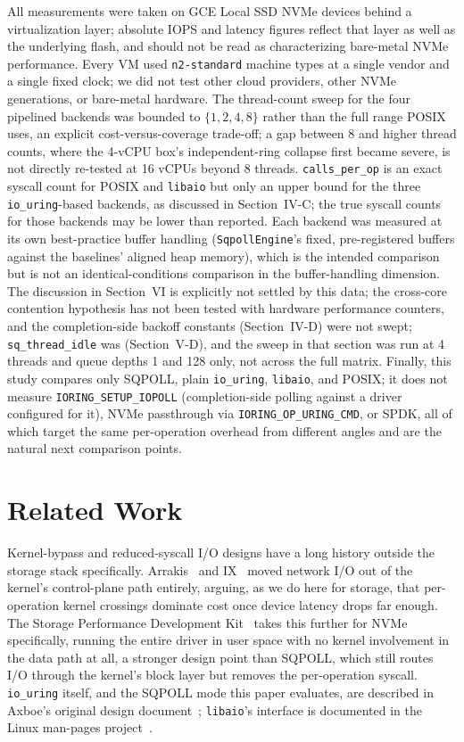 \documentclass[conference]{IEEEtran}
\begin{document}
All measurements were taken on GCE Local SSD NVMe devices behind a virtualization layer;
absolute IOPS and latency figures reflect that layer as well as the underlying flash, and should
not be read as characterizing bare-metal NVMe performance. Every VM used \texttt{n2-standard}
machine types at a single vendor and a single fixed clock; we did not test other cloud providers,
other NVMe generations, or bare-metal hardware. The thread-count sweep for the four pipelined
backends was bounded to $\{1, 2, 4, 8\}$ rather than the full range POSIX uses, an explicit
cost-versus-coverage trade-off; a gap between 8 and higher thread counts, where the 4-vCPU box's
independent-ring collapse first became severe, is not directly re-tested at 16 vCPUs beyond 8
threads. \texttt{calls\_per\_op} is an exact syscall count for POSIX and \texttt{libaio} but only
an upper bound for the three \texttt{io\_uring}-based backends, as discussed in Section~IV-C; the
true syscall counts for those backends may be lower than reported. Each backend was measured at
its own best-practice buffer handling (\texttt{SqpollEngine}'s fixed, pre-registered buffers
against the baselines' aligned heap memory), which is the intended comparison but is not an
identical-conditions comparison in the buffer-handling dimension. The discussion in Section~VI is
explicitly not settled by this data; the cross-core contention hypothesis has not been tested
with hardware performance counters, and the completion-side backoff constants
(Section~IV-D) were not swept; \texttt{sq\_thread\_idle} was (Section~V-D), and the sweep in
that section was run at 4 threads and queue depths 1 and 128 only, not across the full matrix. Finally, this study compares only SQPOLL, plain
\texttt{io\_uring}, \texttt{libaio}, and POSIX; it does not measure
\texttt{IORING\_SETUP\_IOPOLL} (completion-side polling against a driver configured for it),
NVMe passthrough via \texttt{IORING\_OP\_URING\_CMD}, or SPDK, all of which target the same
per-operation overhead from different angles and are the natural next comparison points.

\section{Related Work}

Kernel-bypass and reduced-syscall I/O designs have a long history outside the storage stack
specifically. Arrakis~\cite{arrakis} and IX~\cite{ix} moved network I/O out of the kernel's
control-plane path entirely, arguing, as we do here for storage, that per-operation kernel
crossings dominate cost once device latency drops far enough. The Storage Performance
Development Kit~\cite{spdk} takes this further for NVMe specifically, running the entire driver
in user space with no kernel involvement in the data path at all, a stronger design point than
SQPOLL, which still routes I/O through the kernel's block layer but removes the per-operation
syscall. \texttt{io\_uring} itself, and the SQPOLL mode this paper evaluates, are described in
Axboe's original design document~\cite{axboe-io-uring}; \texttt{libaio}'s interface is documented
in the Linux man-pages project~\cite{aio-manpages}.
\end{document}
